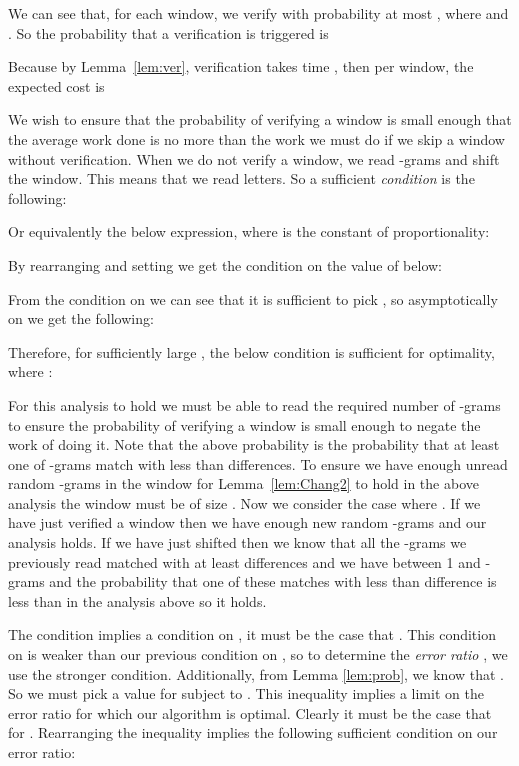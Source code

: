 \documentclass[runningheads, envcountsame, a4paper]{llncs}\usepackage{etex}
\begin{document}
We can see that, for each window, we verify with probability at most , where  
and . So the probability that a verification is triggered is



\noindent Because by Lemma~\ref{lem:ver}, verification takes time , then per window, the expected cost is



\noindent We wish to ensure that the probability of verifying a window is small enough that the average work done is no more than the work we must do if we skip a window without verification. When we do not verify a window, we read  -grams and shift the window. This means that we read  letters. So a sufficient {\em condition} is the following:



\noindent Or equivalently the below expression, where  is the constant of proportionality:



\noindent By rearranging and setting  we get the condition on the value of  below:



\noindent From the condition on  we can see that it is sufficient to pick , so asymptotically on  we get the following:



\noindent Therefore, for sufficiently large , the below condition is sufficient for optimality, where :



\noindent For this analysis to hold we must be able to read the required number of -grams to ensure the probability of verifying a window is small enough to negate the work of doing it. Note that the above probability is the probability that at least one of -grams match with less than  differences. To ensure we have enough unread random -grams in the window for Lemma~\ref{lem:Chang2} to hold in the above analysis the window must be of size . Now we consider the case where . If we have just verified a window then we have enough new random -grams and our analysis holds. If we have just shifted then we know that all the -grams we previously read matched with at least  differences and we have between 1 and  -grams and the probability that one of these matches with less than  difference is less than in the analysis above so it holds.

The condition  implies a condition on , it must be the case that . This condition on  is weaker than our previous condition on , so to determine the {\em error ratio} , we use the stronger condition. Additionally, from Lemma \ref{lem:prob}, we know that .  So we must pick a value for  subject to .
This inequality implies a limit on the error ratio for which our algorithm is optimal. Clearly it must be the case that  for . 
Rearranging the inequality implies the following sufficient condition on our error ratio: 
\end{document}
